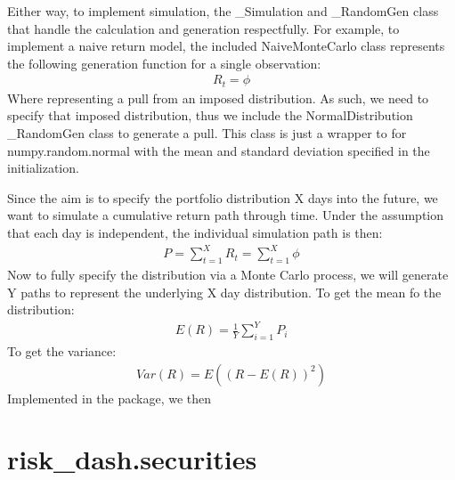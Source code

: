 \documentclass[letterpaper,10pt,english]{sphinxmanual}
\begin{document}
Either way, to implement simulation, the \_Simulation and \_RandomGen
class that handle the calculation and generation respectfully. For
example, to implement a naive return model, the included NaiveMonteCarlo
class represents the following generation function for a single
observation:
\begin{equation*}
\begin{split}R_{t} = \phi\end{split}
\end{equation*}
Where \phi representing a pull from an imposed distribution. As
such, we need to specify that imposed distribution, thus we include the
NormalDistribution \_RandomGen class to generate a pull. This class is
just a wrapper to for numpy.random.normal with the mean and standard
deviation specified in the initialization.

Since the aim is to specify the portfolio distribution X days into the
future, we want to simulate a cumulative return path through time. Under
the assumption that each day is independent, the individual simulation
path is then:
\begin{equation*}
\begin{split}P = \sum_{t=1}^{X} R_{t} = \sum_{t=1}^{X} \phi\end{split}
\end{equation*}
Now to fully specify the distribution via a Monte Carlo process, we will
generate Y paths to represent the underlying X day distribution. To get
the mean fo the distribution:
\begin{equation*}
\begin{split}E(R) = \frac{1}{Y} \sum_{i=1}^{Y} P_{i}\end{split}
\end{equation*}
To get the variance:
\begin{equation*}
\begin{split}Var(R) = E\left(\left(R - E(R)\right)^{2}\right)\end{split}
\end{equation*}
Implemented in the package, we then


\chapter{risk\_dash.securities}
\label{\detokenize{securities:module-risk_dash.securities}}\label{\detokenize{securities:risk-dash-securities}}\label{\detokenize{securities:securities}}\label{\detokenize{securities::doc}}
\end{document}
